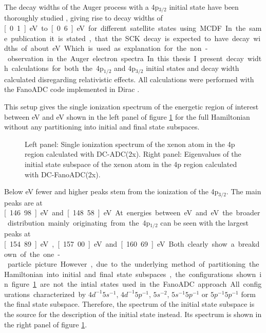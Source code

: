 The decay widths of the Auger process with a 4p$_{3/2}$ initial state have
been thoroughly studied \cite{}, giving rise to decay widths of \unit[0.1]{eV} to
\unit[0.6]{eV} for different satellite states using \ac{MCDF}. In the same publication
it is stated, that the \ac{SCK} decay is expected to have decay widths of
about \unit[10--100]{eV}. Which is used as explanation for the non-observation
in the Auger electron spectra.

In this thesis I present decay width calculations for both the 4p$_{1/2}$ and
4p$_{3/2}$ initial states and decay width calculated disregarding relativistic
effects.
All calculations were performed with the FanoADC code implemented in
Dirac \cite{DIRAC13}.%

This setup gives the single ionization spectrum of the energetic region of
interest between \unit[140]{eV} and \unit[170]{eV} shown in the left panel of
figure
\ref{figure:Xe4p_SIPs} for the full Hamiltonian without any partitioning
into initial and final state subspaces.

\begin{figure}[h]
  \centering
  
  
  \caption{Left panel: Single ionization spectrum of the xenon atom in the 4p region
           calculated with DC-ADC(2x).
           Right panel: Eigenvalues of the initial state subspace of the                 
           xenon atom in the 4p region                                      
           calculated with DC-FanoADC(2x).}
  \label{figure:Xe4p_SIPs}
\end{figure}

Below \unit[150]{eV} fewer and higher peaks stem from the ionization of the
4p$_{3/2}$. The main peaks are at \unit[146.98]{eV} and \unit[148.58]{eV}.
At energies between \unit[150]{eV} and \unit[165]{eV} the broader
distribution mainly originating from the 4p$_{1/2}$ can be seen with the largest
peaks at \unit[154.89]{eV}, \unit[157.00]{eV} and \unit[160.69]{eV}. Both clearly
show a breakdown of the one-particle picture.

However, due to the underlying method of partitioning the Hamiltonian into
initial and final state subspaces, the configurations shown in figure
\ref{figure:Xe4p_SIPs} are not the intial states used in the FanoADC approach.
All configurations characterized by $4d^{-1}5s^{-1}$, $4d^{-1}5p^{-1}$,
$5s^{-2}$, $5s^{-1}5p^{-1}$ or $5p^{-1}5p^{-1}$ form the final state subspace.
Therefore, the spectrum of the initial state subspace is the source for
the description of the initial state instead. Its spectrum is shown in
the right panel of figure \ref{figure:Xe4p_SIPs}.

